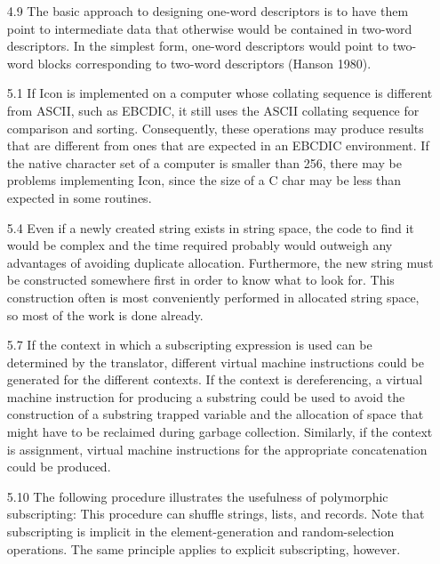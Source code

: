 \begin{itemize}
\goodbreak\item[4.9]
 The basic approach to designing one-word descriptors is to have them
point to intermediate data that otherwise would be contained in two-word
descriptors. In the simplest form, one-word descriptors would point to
two-word blocks corresponding to two-word descriptors (Hanson 1980).

\goodbreak\item[5.1]
 If Icon is implemented on a computer whose collating sequence is different 
from ASCII, such as EBCDIC, it still uses the ASCII collating
sequence for comparison and sorting. Consequently, these operations may
produce results that are different from ones that are expected in an
EBCDIC environment. If the native character set of a computer is smaller
than 256, there may be problems implementing Icon, since the size of a C
char may be less than expected in some routines.

\goodbreak\item[5.4]
Even if a newly created string exists in string space, the code to find it
would be complex and the time required probably would outweigh any
advantages of avoiding duplicate allocation. Furthermore, the new string
must be constructed somewhere first in order to know what to look for.
This construction often is most conveniently performed in allocated string
space, so most of the work is done already.

\goodbreak\item[5.7]
If the context in which a subscripting expression is used can be determined
by the translator, different virtual machine instructions could be
generated for the different contexts. If the context is dereferencing, a virtual
machine instruction for producing a substring could be used to avoid
the construction of a substring trapped variable and the allocation of
space that might have to be reclaimed during garbage collection. Similarly,
if the context is assignment, virtual machine instructions for the
appropriate concatenation could be produced.

\goodbreak\item[5.10]
The following procedure illustrates the usefulness of polymorphic subscripting:
This procedure can shuffle strings, lists, and records. Note that subscripting
is implicit in the element-generation and random-selection operations.
The same principle applies to explicit subscripting, however.


\end{itemize}
